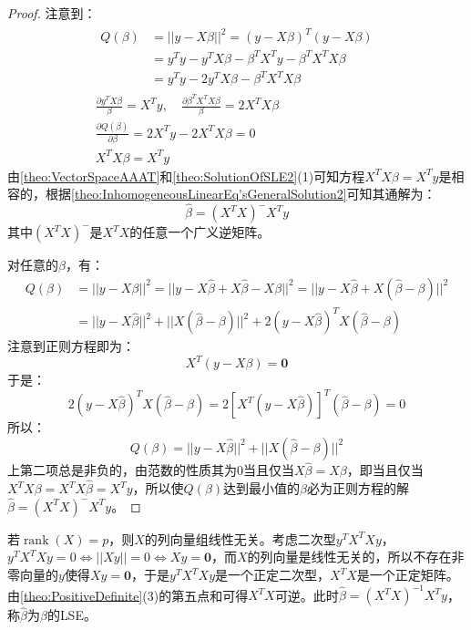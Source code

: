 \begin{proof}
	注意到：
	\begin{gather*}
		\begin{aligned}
			Q(\beta)&=||y-X\beta||^2=(y-X\beta)^T(y-X\beta) \\
			&=y^Ty-y^TX\beta-\beta^TX^Ty-\beta^TX^TX\beta \\
			&=y^Ty-2y^TX\beta-\beta^TX^TX\beta
		\end{aligned}\\
		\frac{\partial y^TX\beta}{\beta}=X^Ty,\quad
		\frac{\partial \beta^TX^TX\beta}{\beta}=2X^TX\beta \\
		\frac{\partial Q(\beta)}{\partial\beta}=2X^Ty-2X^TX\beta=0 \\
		X^TX\beta=X^Ty
	\end{gather*}
	由\cref{theo:VectorSpaceAAAT}和\cref{theo:SolutionOfSLE2}(1)可知方程$X^TX\beta=X^Ty$是相容的，根据\cref{theo:InhomogeneousLinearEq'sGeneralSolution2}可知其通解为：
	\begin{equation*}
		\hat{\beta}=(X^TX)^-X^Ty
	\end{equation*}
	其中$(X^TX)^-$是$X^TX$的任意一个广义逆矩阵。\par
	对任意的$\beta$，有：
	\begin{align*}
		Q(\beta)&=||y-X\beta||^2=||y-X\hat{\beta}+X\hat{\beta}-X\beta||^2=||y-X\hat{\beta}+X(\hat{\beta}-\beta)||^2 \\
		&=||y-X\hat{\beta}||^2+||X(\hat{\beta}-\beta)||^2+2(y-X\hat{\beta})^TX(\hat{\beta}-\beta)
	\end{align*}
	注意到正则方程即为：
	\begin{equation*}
		X^T(y-X\beta)=\mathbf{0}
	\end{equation*}
	于是：
	\begin{equation*}
		2(y-X\hat{\beta})^TX(\hat{\beta}-\beta)=2[X^T(y-X\hat{\beta})]^T(\hat{\beta}-\beta)=0
	\end{equation*}
	所以：
	\begin{equation*}
		Q(\beta)=||y-X\hat{\beta}||^2+||X(\hat{\beta}-\beta)||^2
	\end{equation*}
	上第二项总是非负的，由范数的性质其为$0$当且仅当$X\hat{\beta}=X\beta$，即当且仅当$X^TX\beta=X^TX\hat{\beta}=X^Ty$，所以使$Q(\beta)$达到最小值的$\beta$必为正则方程的解$\hat{\beta}=(X^TX)^-X^Ty$。
\end{proof}
\begin{derivation}
	若$\operatorname{rank}(X)=p$，则$X$的列向量组线性无关。考虑二次型$y^TX^TXy$，$y^TX^TXy=0\Leftrightarrow||Xy||=0\Leftrightarrow Xy=\mathbf{0}$，而$X$的列向量是线性无关的，所以不存在非零向量的$y$使得$Xy=\mathbf{0}$，于是$y^TX^TXy$是一个正定二次型，$X^TX$是一个正定矩阵。由\cref{theo:PositiveDefinite}(3)的第五点和可得$X^TX$可逆。此时$\hat{\beta}=(X^TX)^{-1}X^Ty$，称$\hat{\beta}$为$\beta$的\gls{LSE}。
\end{derivation}
